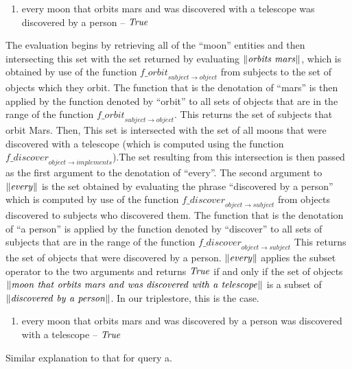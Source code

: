 \documentclass[../main.tex]{subfiles}
\begin{document}
\begin{refsection}
\begin{enumerate}[before=\small, label=\alph*.]
	\setlength\itemsep{0em}
	\item every moon that orbits mars and was discovered with a telescope was discovered by a person – $\mathit{True}$
\end{enumerate}
The evaluation begins by retrieving all of the ``moon'' entities and then
intersecting this set with the set returned by evaluating $\lVert \mathit{orbits\ mars} \rVert$, which is obtained by use of the
function $\mathit{f\_orbit}_{\mathit{subject} \rightarrow \mathit{object}}$ from subjects to the set of objects which they orbit. The function that is the
denotation of ``mars'' is then applied by the function denoted by ``orbit'' to all sets of objects that are in
the range of the function $\mathit{f\_orbit}_{\mathit{subject} \rightarrow \mathit{object}}$. This returns the set of subjects that orbit Mars. Then, This set is
intersected with the set of all moons that were discovered with a telescope (which is computed using
the function $\mathit{f\_discover}_{\mathit{object} \rightarrow \mathit{implements}}$).The set resulting from this intersection is then passed as the first
argument to the denotation of ``every''. The second argument to $\lVert \mathit{\mathit{every}} \rVert$ is the set obtained by
evaluating the phrase ``discovered by a person'' which is computed by use of the function $\mathit{f\_discover}_{\mathit{object} \rightarrow \mathit{subject}}$ from objects discovered to subjects who discovered them. The function that is the denotation of ``a
person'' is applied by the function denoted by ``discover'' to all sets of subjects that are in the range of
the function $\mathit{f\_discover}_{\mathit{object} \rightarrow \mathit{subject}}$ This returns the set of objects that were discovered by a person.
$\lVert \mathit{every} \rVert$ applies the subset operator to the two arguments and returns $\mathit{True}$ if and only if the set of objects
$\meaningof{moon\ that\ orbits\ mars\ and\ was\ discovered\ with\ a\ telescope}$ is a subset of $\lVert \mathit{discovered\ by\ a\ person} \rVert$. In
our triplestore, this is the case.
\begin{enumerate}[before=\small, label=\alph*.]
	\setlength\itemsep{0em}
	\setcounter{enumi}{1}
	\item every moon that orbits mars and was discovered  by a person was discovered with a telescope – $\mathit{True}$
\end{enumerate}
\noindent Similar explanation to that for query a.
\begin{enumerate}[before=\small, label=\alph*.]
	\setlength\itemsep{0em}

\end{enumerate}
\end{refsection}
\end{document}
